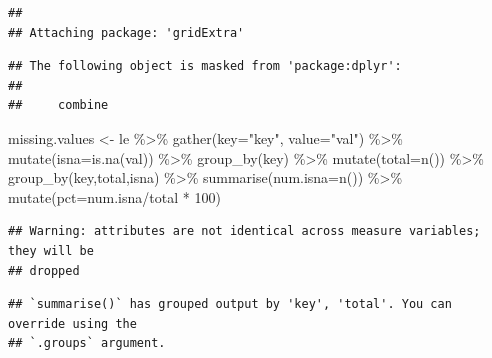 \documentclass[
]{article}
\newenvironment{Shaded}{\begin{snugshade}}{\end{snugshade}}
\newcommand{\AttributeTok}[1]{\textcolor[rgb]{0.77,0.63,0.00}{#1}}
\newcommand{\DecValTok}[1]{\textcolor[rgb]{0.00,0.00,0.81}{#1}}
\newcommand{\FunctionTok}[1]{\textcolor[rgb]{0.00,0.00,0.00}{#1}}
\newcommand{\NormalTok}[1]{#1}
\newcommand{\OtherTok}[1]{\textcolor[rgb]{0.56,0.35,0.01}{#1}}
\newcommand{\SpecialCharTok}[1]{\textcolor[rgb]{0.00,0.00,0.00}{#1}}
\newcommand{\StringTok}[1]{\textcolor[rgb]{0.31,0.60,0.02}{#1}}
\begin{document}
\begin{verbatim}
## 
## Attaching package: 'gridExtra'
\end{verbatim}

\begin{verbatim}
## The following object is masked from 'package:dplyr':
## 
##     combine
\end{verbatim}

\begin{Shaded}
\begin{Highlighting}[]
\NormalTok{missing.values }\OtherTok{\textless{}{-}}\NormalTok{ le }\SpecialCharTok{\%\textgreater{}\%}
  \FunctionTok{gather}\NormalTok{(}\AttributeTok{key=}\StringTok{"key"}\NormalTok{, }\AttributeTok{value=}\StringTok{"val"}\NormalTok{) }\SpecialCharTok{\%\textgreater{}\%}
  \FunctionTok{mutate}\NormalTok{(}\AttributeTok{isna=}\FunctionTok{is.na}\NormalTok{(val)) }\SpecialCharTok{\%\textgreater{}\%}
  \FunctionTok{group\_by}\NormalTok{(key) }\SpecialCharTok{\%\textgreater{}\%}
  \FunctionTok{mutate}\NormalTok{(}\AttributeTok{total=}\FunctionTok{n}\NormalTok{()) }\SpecialCharTok{\%\textgreater{}\%}
  \FunctionTok{group\_by}\NormalTok{(key,total,isna) }\SpecialCharTok{\%\textgreater{}\%}
  \FunctionTok{summarise}\NormalTok{(}\AttributeTok{num.isna=}\FunctionTok{n}\NormalTok{()) }\SpecialCharTok{\%\textgreater{}\%}
  \FunctionTok{mutate}\NormalTok{(}\AttributeTok{pct=}\NormalTok{num.isna}\SpecialCharTok{/}\NormalTok{total }\SpecialCharTok{*} \DecValTok{100}\NormalTok{)}
\end{Highlighting}
\end{Shaded}

\begin{verbatim}
## Warning: attributes are not identical across measure variables; they will be
## dropped
\end{verbatim}

\begin{verbatim}
## `summarise()` has grouped output by 'key', 'total'. You can override using the
## `.groups` argument.
\end{verbatim}
\end{document}
